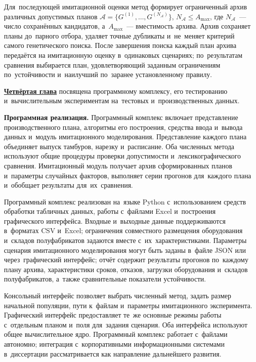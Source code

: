 Для~последующей имитационной оценки метод формирует ограниченный архив различных допустимых планов $\mathcal A=\{G^{(1)},\ldots,G^{(N_{\mathcal A})}\}$, $N_{\mathcal A}\leq A_{\max}$, где $N_{\mathcal A}$~--- число сохранённых кандидатов, а~$A_{\max}$~--- вместимость архива. Архив сохраняет планы до~парного отбора, удаляет точные дубликаты и~не~меняет критерий самого генетического поиска. После завершения поиска каждый план архива передаётся на имитационную оценку в~одинаковых сценариях; по~результатам сравнения выбирается план, удовлетворяющий заданным ограничениям по~устойчивости и~наилучший по~заранее установленному правилу.


\underline{\textbf{Четвёртая глава}} посвящена программному комплексу, его тестированию и~вычислительным экспериментам на~тестовых и~производственных данных.

\textbf{Программная реализация.} Программный комплекс включает представление производственного плана, алгоритмы его построения, средства ввода и~вывода данных и~модуль имитационного моделирования. Представление каждого плана объединяет выпуск тамбуров, нарезку и~расписание. Оба численных метода используют общие процедуры проверки допустимости и~лексикографического сравнения. Имитационный модуль получает архив сформированных планов и~параметры случайных факторов, выполняет серии прогонов для~каждого плана и~обобщает результаты для~их~сравнения.

Программный комплекс реализован на~языке Python с~использованием средств обработки табличных данных, работы с~файлами Excel и~построения графического интерфейса. Входные и~выходные данные поддерживаются в~форматах CSV и~Excel; ограничения совместного размещения оборудования и~складов полуфабрикатов задаются вместе с~их~характеристиками. Параметры сценария имитационного моделирования могут быть заданы в~файле JSON или через~графический интерфейс; отчёт содержит результаты прогонов по~каждому плану архива, характеристики сроков, отказов, загрузки оборудования и~складов полуфабрикатов, а~также сравнительные показатели устойчивости.

Консольный интерфейс позволяет выбрать численный метод, задать размер начальной популяции, пути к~файлам и~параметры имитационного эксперимента. Графический интерфейс предоставляет те~же основные режимы работы с~отдельным планом и~поля для~задания сценария. Оба интерфейса используют общее вычислительное ядро. Программный комплекс работает с~файлами автономно; интеграция с~корпоративными информационными системами в~диссертации рассматривается как направление дальнейшего развития.

